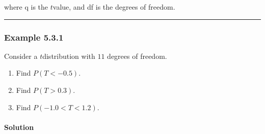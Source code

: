 \documentclass[letterpaper,10pt,english]{jupyterBook}
\begin{document}
\begin{sphinxVerbatim}[commandchars=\\\{\}]
\end{sphinxVerbatim}

\sphinxAtStartPar
where q is the \(t\)\sphinxhyphen{}value, and df is the degrees of freedom.


\bigskip\hrule\bigskip



\subsubsection{Example 5.3.1}
\label{\detokenize{Ch5 Confidence Intervals/5.3 Student's t-Distribution:example-5-3-1}}
\sphinxAtStartPar
Consider a \(t\)\sphinxhyphen{}distribution with \(11\) degrees of freedom.
\begin{enumerate}
%
\item {} 
\sphinxAtStartPar
Find \(P(T < -0.5)\).

\item {} 
\sphinxAtStartPar
Find \(P(T > 0.3)\).

\item {} 
\sphinxAtStartPar
Find \(P(-1.0 < T < 1.2)\).

\end{enumerate}


\paragraph{Solution}
\label{\detokenize{Ch5 Confidence Intervals/5.3 Student's t-Distribution:solution}}
\end{document}
